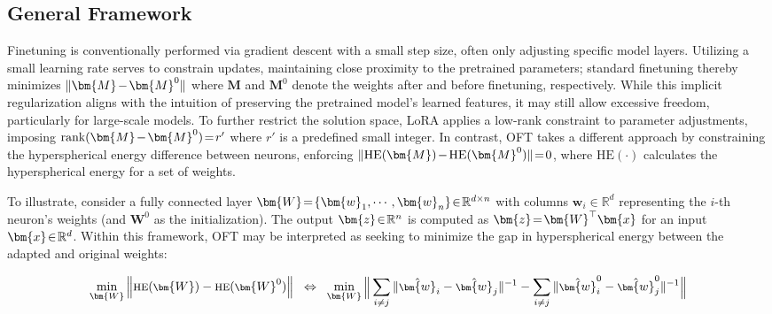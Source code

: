 \subsection{General Framework}

Finetuning is conventionally performed via gradient descent with a small step size, often only adjusting specific model layers. Utilizing a small learning rate serves to constrain updates, maintaining close proximity to the pretrained parameters; standard finetuning thereby minimizes $\thickmuskip=2mu \medmuskip=2mu \| \bm{M} - \bm{M}^0\|$ where $\bm{M}$ and $\bm{M}^0$ denote the weights after and before finetuning, respectively. While this implicit regularization aligns with the intuition of preserving the pretrained model's learned features, it may still allow excessive freedom, particularly for large-scale models. To further restrict the solution space, LoRA applies a low-rank constraint to parameter adjustments, imposing $\thickmuskip=2mu \medmuskip=2mu \text{rank}(\bm{M} - \bm{M}^0)=r'$ where $r'$ is a predefined small integer. In contrast, OFT takes a different approach by constraining the hyperspherical energy difference between neurons, enforcing $\thickmuskip=2mu \medmuskip=2mu \| \text{HE}(\bm{M})-\text{HE}(\bm{M}^0) \|=0$, where $\text{HE}(\cdot)$ calculates the hyperspherical energy for a set of weights.

To illustrate, consider a fully connected layer $\thickmuskip=2mu \medmuskip=2mu \bm{W}=\{\bm{w}_1,\cdots,\bm{w}_n\}\in\mathbb{R}^{d\times n}$ with columns $\bm{w}_i\in\mathbb{R}^{d}$ representing the $i$-th neuron's weights (and $\bm{W}^0$ as the initialization). The output $\thickmuskip=2mu \medmuskip=2mu \bm{z}\in\mathbb{R}^n$ is computed as $\thickmuskip=2mu \medmuskip=2mu \bm{z}=\bm{W}^\top\bm{x}$ for an input $\thickmuskip=2mu \medmuskip=2mu \bm{x}\in\mathbb{R}^d$. Within this framework, OFT may be interpreted as seeking to minimize the gap in hyperspherical energy between the adapted and original weights:

\begin{equation}\label{eq:oft_principle}
\footnotesize
\min_{\bm{W}} \left\| \text{HE}(\bm{W})-\text{HE}(\bm{W}^0)\right\|~~\Leftrightarrow~~\min_{\bm{W}} \bigg{\|} \sum_{i\neq j} \|\hat{\bm{w}}_i-\hat{\bm{w}}_j\|^{-1}-\sum_{i\neq j} \|\hat{\bm{w}}^0_i-\hat{\bm{w}}^0_j\|^{-1}\bigg{\|}
\end{equation}

